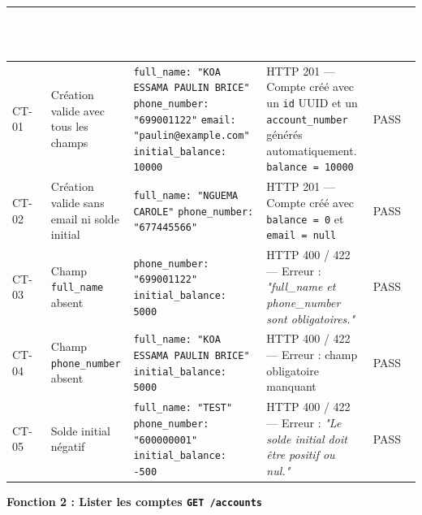 \documentclass[12pt,a4paper,landscape]{article}
\begin{document}
\begin{longtable}{|L{2cm}|L{5cm}|L{6.5cm}|L{5cm}|L{2.5cm}|}
\hline
{}
\textbf{\textcolor{white}{Test Case ID}} &
\textbf{\textcolor{white}{Test Case Description}} &
\textbf{\textcolor{white}{Test Input (Test Case Value)}} &
\textbf{\textcolor{white}{Expected Results}} &
\textbf{\textcolor{white}{Test Case Status}} \\
\hline
CT-01 &
Création valide avec tous les champs &
\texttt{full\_name: "KOA ESSAMA PAULIN BRICE"} \newline \texttt{phone\_number: "699001122"} \newline \texttt{email: "paulin@example.com"} \newline \texttt{initial\_balance: 10000} &
HTTP 201 — Compte créé avec un \texttt{id} UUID et un \texttt{account\_number} générés automatiquement. \texttt{balance = 10000} &
PASS \\
\hline
{}
CT-02 &
Création valide sans email ni solde initial &
\texttt{full\_name: "NGUEMA CAROLE"} \newline \texttt{phone\_number: "677445566"} &
HTTP 201 — Compte créé avec \texttt{balance = 0} et \texttt{email = null} &
PASS \\
\hline
CT-03 &
Champ \texttt{full\_name} absent &
\texttt{phone\_number: "699001122"} \newline \texttt{initial\_balance: 5000} &
HTTP 400 / 422 — Erreur : \textit{"full\_name et phone\_number sont obligatoires."} &
PASS \\
\hline
{}
CT-04 &
Champ \texttt{phone\_number} absent &
\texttt{full\_name: "KOA ESSAMA PAULIN BRICE"} \newline \texttt{initial\_balance: 5000} &
HTTP 400 / 422 — Erreur : champ obligatoire manquant &
PASS \\
\hline
CT-05 &
Solde initial négatif &
\texttt{full\_name: "TEST"} \newline \texttt{phone\_number: "600000001"} \newline \texttt{initial\_balance: -500} &
HTTP 400 / 422 — Erreur : \textit{"Le solde initial doit être positif ou nul."} &
PASS \\
\hline
\end{longtable}

\vspace{0.3cm}
{\bfseries\large\textcolor{rowtitle}{Fonction 2 : Lister les comptes \quad \texttt{GET /accounts}}}
\vspace{0.2cm}
\end{document}
